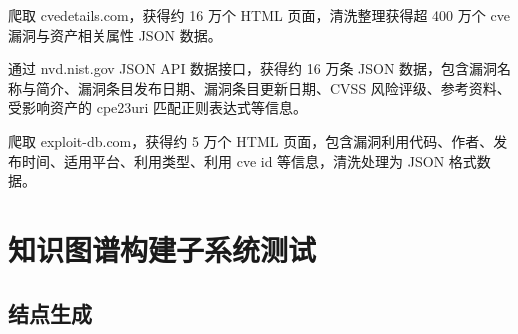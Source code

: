 \documentclass[a4paper,AutoFakeBold,oneside,12pt]{book}
\begin{document}

爬取 cvedetails.com，获得约 16 万个 HTML 页面，清洗整理获得超 400 万个 cve 漏洞与资产相关属性 JSON 数据。%


通过 nvd.nist.gov JSON API 数据接口，获得约 16 万条 JSON 数据，包含漏洞名称与简介、漏洞条目发布日期、漏洞条目更新日期、CVSS 风险评级、参考资料、受影响资产的 cpe23uri 匹配正则表达式等信息。%


爬取 exploit-db.com，获得约 5 万个 HTML 页面，包含漏洞利用代码、作者、发布时间、适用平台、利用类型、利用 cve id 等信息，清洗处理为 JSON 格式数据。%



\section{知识图谱构建子系统测试}

\subsection{结点生成}
\end{document}
